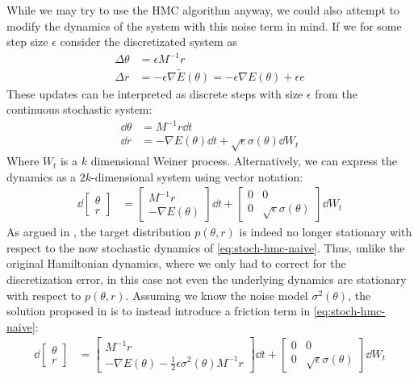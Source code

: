 While we may try to use the HMC algorithm anyway, we could also attempt to modify the dynamics of the system with this noise term in mind.
If we for some step size $\epsilon$ consider the discretizated system as
\begin{align}
    \Delta \theta &=  \epsilon M^{-1} r\\
    \Delta r &=  -\epsilon\nabla{\tilde{E}}(\theta) = -\epsilon\nabla{E}(\theta)  + \epsilon e
\end{align}
These updates can be interpreted as discrete steps with size $\epsilon$ from the continuous stochastic system:
\begin{align*}
    \dd{\theta} &= M^{-1} r\dd{t} \\
    \dd{r} &= -\nabla{E}(\theta)\dd{t}  + \sqrt{\epsilon}\sigma(\theta) \dd{W_t} 
\end{align*}
Where $W_t$ is a $k$ dimensional Weiner process.
Alternatively, we can express the dynamics as a $2k$-dimensional system using vector notation:
\begin{align} \label{eq:stoch-hmc-naive}
    \dd{\begin{bmatrix}\theta \\ r \end{bmatrix}} &= 
    \begin{bmatrix}
        M^{-1}r \\ -\nabla{E}(\theta) 
    \end{bmatrix} \dd{t} + \begin{bmatrix}
        0 & 0 \\ 
        0 & \sqrt{\epsilon}\sigma(\theta)
    \end{bmatrix} \dd{W_t}
\end{align}
As argued in \cite{chen_stochastic_2014}, the target distribution $p(\theta, r)$ is indeed no longer stationary with respect to the now stochastic dynamics of \cref{eq:stoch-hmc-naive}.
Thus, unlike the original Hamiltonian dynamics, where we only had to correct for the discretization error, in this case not even the underlying dynamics are stationary with respect to $p(\theta, r)$.
Assuming we know the noise model $\sigma^2(\theta)$, the solution proposed in \cite{chen_stochastic_2014} is to instead introduce a friction term in \cref{eq:stoch-hmc-naive}:
\begin{align} \label{eq:stoch-hmc-w-friction}
    \dd{\begin{bmatrix}\theta \\ r \end{bmatrix}} &= 
    \begin{bmatrix}
        M^{-1}r \\ -\nabla{E}(\theta)-\frac{1}{2}\epsilon\sigma^2(\theta)M^{-1}r
    \end{bmatrix} \dd{t} + \begin{bmatrix}
        0 & 0 \\ 
        0 & \sqrt{\epsilon}\sigma(\theta)
    \end{bmatrix} \dd{W_t}
\end{align}

